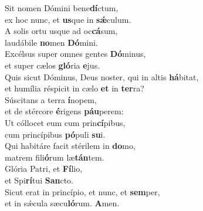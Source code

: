 \evenverse Sit nomen Dómini bene\textbf{dí}ctum,~\*\\
\evenverse ex hoc nunc, et \textbf{us}que in \textbf{sǽ}culum.\\
\oddverse A solis ortu usque ad oc\textbf{cá}sum,~\*\\
\oddverse laudábile \textbf{no}men \textbf{Dó}mini.\\
\evenverse Excélsus super omnes gentes \textbf{Dó}minus,~\*\\
\evenverse et super cælos \textbf{gló}ria \textbf{e}jus.\\
\oddverse Quis sicut Dóminus, Deus noster, qui in altis \textbf{há}bitat,~\*\\
\oddverse et humília réspicit in cælo \textbf{et} in \textbf{ter}ra?\\
\evenverse Súscitans a terra \textbf{í}nopem,~\*\\
\evenverse et de stércore \textbf{é}rigens \textbf{páu}perem:\\
\oddverse Ut cóllocet eum cum prin\textbf{cí}pibus,~\*\\
\oddverse cum princípibus \textbf{pó}puli \textbf{su}i.\\
\evenverse Qui habitáre facit stérilem in \textbf{do}mo,~\*\\
\evenverse matrem fili\textbf{ó}rum læ\textbf{tán}tem.\\
\oddverse Glória Patri, et \textbf{Fí}lio,~\*\\
\oddverse et Spi\textbf{rí}tui \textbf{San}cto.\\
\evenverse Sicut erat in princípio, et nunc, et \textbf{sem}per,~\*\\
\evenverse et in sǽcula sæcu\textbf{ló}rum. \textbf{A}men.\\
